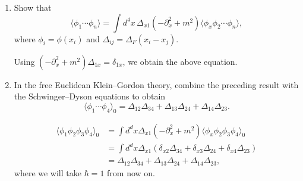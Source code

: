 \begin{enumerate}[label=\alph*)]
    \item Show that
    \begin{equation}
        \langle\phi_1\cdots\phi_n\rangle
        =\int d^4x\,
        \Delta_{x1}(-\partial_x^2+m^2)
        \langle\phi_x\phi_2\cdots\phi_n\rangle,
    \end{equation}
    where $\phi_i=\phi(x_i)$ and
    $\Delta_{ij}=\Delta_F(x_i-x_j)$.
    \begin{solution}
        Using $(-\partial_x^2+m^2)\Delta_{1x} = \delta_{1x}$, we obtain the above equation.
    \end{solution}

    \item In the free Euclidean Klein--Gordon theory, combine the preceding result
    with the Schwinger--Dyson equations to obtain
    \begin{equation}
        \langle\phi_1\cdots\phi_4\rangle_0
        =\Delta_{12}\Delta_{34}
        +\Delta_{13}\Delta_{24}
        +\Delta_{14}\Delta_{23}.
    \end{equation}
    \begin{solution}
        \begin{equation}
            \begin{aligned}
                \langle\phi_1\phi_2\phi_3\phi_4\rangle_0 &= \int d^dx \Delta_{x1}(-\partial_x^2 +m^2)\langle\phi_x\phi_2\phi_3\phi_4\rangle_0\\
                &=\int d^dx \Delta_{x1}(\delta_{x2}\Delta_{34} + \delta_{x3}\Delta_{24} + \delta_{x4}\Delta_{23})\\
                &=\Delta_{12}\Delta_{34}
        +\Delta_{13}\Delta_{24}
        +\Delta_{14}\Delta_{23},
            \end{aligned}
        \end{equation}
        where we will take $\hbar =1$ from now on.
    \end{solution}


\end{enumerate}
